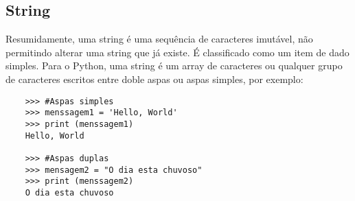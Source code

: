             \subsection{String}
            Resumidamente, uma string é uma sequência de caracteres imutável, não permitindo alterar uma string que já existe. É classificado como um item de dado simples. Para o Python, uma string é um array de caracteres ou qualquer grupo de caracteres escritos entre doble aspas ou aspas simples, por exemplo:
    \begin{lstlisting}
    >>> #Aspas simples
    >>> menssagem1 = 'Hello, World'
    >>> print (menssagem1)  
    Hello, World
    
    >>> #Aspas duplas
    >>> mensagem2 = "O dia esta chuvoso"
    >>> print (menssagem2)
    O dia esta chuvoso
    \end{lstlisting}
			

